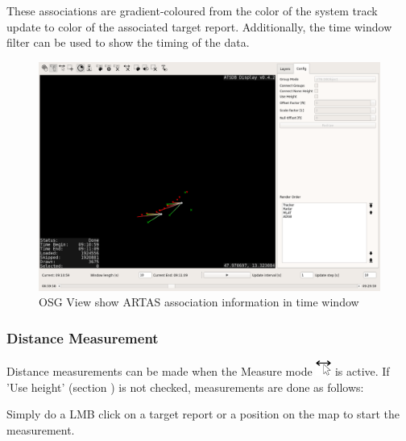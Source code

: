 These associations are gradient-coloured from the color of the system track update to color of the associated target report. Additionally, the time window filter can be used to show the timing of the data.

\begin{figure}[H]
    \hspace*{-2.5cm}
    \includegraphics[width=19cm]{figures/osgview_assoc_time_window.png}
  \caption{OSG View show ARTAS association information in time window}
\end{figure}


\subsubsection{Distance Measurement}

Distance measurements can be made when the Measure mode \includegraphics[width=0.5cm,frame]{../../data/icons/measure_action.png} is active. If 'Use height' (section ) is not checked, measurements are done as follows:

Simply do a LMB click on a target report or a position on the map to start the measurement.

